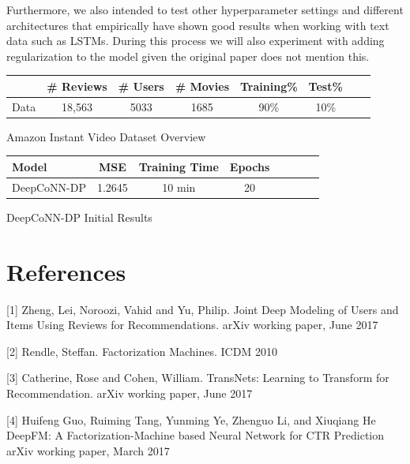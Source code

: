 \documentclass[10pt,twocolumn,letterpaper]{article}
\begin{document}
Furthermore, we also intended to test other hyperparameter settings and different architectures that empirically have shown good results when working with text data such as LSTMs. During this process we will also experiment with adding regularization to the model given the original paper does not mention this.  

\begin{exhibit}
\begin{center}
{\small
\begin{tabular}{l|ccccccc}
\hline
 & \# Reviews & \# Users & \# Movies & Training\% & Test\% \\
\hline
Data & 18,563  & 5033 & 1685 & 90\% & 10\%  \\
\hline
\end{tabular}
}
\end{center}
\caption{Amazon Instant Video Dataset Overview}
\end{exhibit}

\begin{exhibit}
\begin{center}
{\small
\begin{tabular}{l|ccccccc}
\hline
Model & MSE & Training Time & Epochs \\
\hline
DeepCoNN-DP & 1.2645 & 10 min & 20  \\
\hline
\end{tabular}
}
\end{center}
\caption{DeepCoNN-DP Initial Results}
\end{exhibit}


\section{References}

[1] Zheng, Lei, Noroozi, Vahid and Yu, Philip. Joint Deep Modeling of Users
 and Items Using Reviews for Recommendations. arXiv working paper, June 2017

[2] Rendle, Steffan. Factorization Machines. ICDM 2010

[3] Catherine, Rose and Cohen, William. TransNets: Learning to Transform
for Recommendation. arXiv working paper, June 2017

[4] Huifeng Guo, Ruiming Tang, Yunming Ye, Zhenguo Li, and Xiuqiang He
DeepFM: A Factorization-Machine based Neural Network for CTR Prediction
arXiv working paper, March 2017
\end{document}
